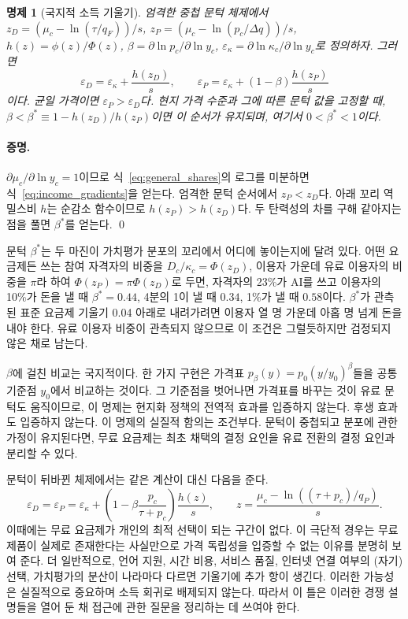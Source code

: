 \documentclass[11pt]{article}
\newtheorem{aproposition}{명제}[section]
\theoremstyle{definition}
\theoremstyle{remark}
\begin{document}
\begin{aproposition}[국지적 소득 기울기]\label{prop:margins}
엄격한 중첩 문턱 체제에서
$z_D=(\mu_c-\ln(\tau/q_F))/s$,
$z_P=(\mu_c-\ln(p_c/\Delta q))/s$,
$h(z)=\phi(z)/\Phi(z)$,
$\beta=\partial\ln p_c/\partial\ln y_c$,
$\varepsilon_\kappa=\partial\ln\kappa_c/\partial\ln y_c$로 정의하자.
그러면
\begin{equation}
 \varepsilon_D=\varepsilon_\kappa+\frac{h(z_D)}{s},\qquad
 \varepsilon_P=\varepsilon_\kappa+(1-\beta)\frac{h(z_P)}{s}
 \label{eq:income_gradients}
\end{equation}
이다. 균일 가격이면 $\varepsilon_P>\varepsilon_D$다. 현지 가격 수준과 그에 따른 문턱 값을 고정할 때, $\beta<\beta^*\equiv1-h(z_D)/h(z_P)$이면 이 순서가 유지되며, 여기서 $0<\beta^*<1$이다.\end{aproposition}

\paragraph{증명.}
$\partial\mu_c/\partial\ln y_c=1$이므로 식~\eqref{eq:general_shares}의 로그를 미분하면 식~\eqref{eq:income_gradients}을 얻는다. 엄격한 문턱 순서에서 $z_P<z_D$다. 아래 꼬리 역밀스비 $h$는 순감소 함수이므로 $h(z_P)>h(z_D)$다. 두 탄력성의 차를 구해 같아지는 점을 풀면 $\beta^*$를 얻는다. \qed

문턱 $\beta^*$는 두 마진이 가치평가 분포의 꼬리에서 어디에 놓이는지에 달려 있다. 어떤 요금제든 쓰는 참여 자격자의 비중을 $D_c/\kappa_c=\Phi(z_D)$, 이용자 가운데 유료 이용자의 비중을 $\pi$라 하여 $\Phi(z_P)=\pi\Phi(z_D)$로 두면, 자격자의 23\%가 AI를 쓰고 이용자의 10\%가 돈을 낼 때 $\beta^*=0.44$, 4분의 1이 낼 때 $0.34$, 1\%가 낼 때 $0.58$이다. $\beta^*$가 관측된 표준 요금제 기울기 0.04 아래로 내려가려면 이용자 열 명 가운데 아홉 명 넘게 돈을 내야 한다. 유료 이용자 비중이 관측되지 않으므로 이 조건은 그럴듯하지만 검정되지 않은 채로 남는다.

$\beta$에 걸친 비교는 국지적이다. 한 가지 구현은 가격표 $p_\beta(y)=p_0(y/y_0)^\beta$들을 공통 기준점 $y_0$에서 비교하는 것이다. 그 기준점을 벗어나면 가격표를 바꾸는 것이 유료 문턱도 움직이므로, 이 명제는 현지화 정책의 전역적 효과를 입증하지 않는다. 후생 효과도 입증하지 않는다. 이 명제의 실질적 함의는 조건부다. 문턱이 중첩되고 분포에 관한 가정이 유지된다면, 무료 요금제는 최초 채택의 결정 요인을 유료 전환의 결정 요인과 분리할 수 있다.

문턱이 뒤바뀐 체제에서는 같은 계산이 대신 다음을 준다.
\begin{equation}
 \varepsilon_D=\varepsilon_P
 =\varepsilon_\kappa+
 \left(1-\beta\frac{p_c}{\tau+p_c}\right)\frac{h(z)}{s},
 \qquad z=\frac{\mu_c-\ln((\tau+p_c)/q_P)}{s}.
 \label{eq:reversed_gradients}
\end{equation}
이때에는 무료 요금제가 개인의 최적 선택이 되는 구간이 없다. 이 극단적 경우는 무료 제품이 실제로 존재한다는 사실만으로 가격 독립성을 입증할 수 없는 이유를 분명히 보여 준다. 더 일반적으로, 언어 지원, 시간 비용, 서비스 품질, 인터넷 연결 여부의 (자기)선택, 가치평가의 분산이 나라마다 다르면 기울기에 추가 항이 생긴다. 이러한 가능성은 실질적으로 중요하며 소득 회귀로 배제되지 않는다. 따라서 이 틀은 이러한 경쟁 설명들을 열어 둔 채 접근에 관한 질문을 정리하는 데 쓰여야 한다.
\end{document}
